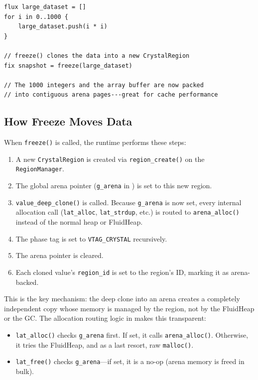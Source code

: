 \begin{lstlisting}[language=Lattice, caption={Freeze allocates into a CrystalRegion}]
flux large_dataset = []
for i in 0..1000 {
    large_dataset.push(i * i)
}

// freeze() clones the data into a new CrystalRegion
fix snapshot = freeze(large_dataset)

// The 1000 integers and the array buffer are now packed
// into contiguous arena pages---great for cache performance
\end{lstlisting}

\subsection{How Freeze Moves Data}

When \lstinline|freeze()| is called, the runtime performs these steps:

\begin{enumerate}
  \item A new \lstinline|CrystalRegion| is created via \lstinline|region_create()| on the \lstinline|RegionManager|.
  \item The global arena pointer (\lstinline|g_arena| in ) is set to this new region.
  \item \lstinline|value_deep_clone()| is called. Because \lstinline|g_arena| is now set, every internal allocation call (\lstinline|lat_alloc|, \lstinline|lat_strdup|, etc.) is routed to \lstinline|arena_alloc()| instead of the normal heap or FluidHeap.
  \item The phase tag is set to \lstinline|VTAG_CRYSTAL| recursively.
  \item The arena pointer is cleared.
  \item Each cloned value's \lstinline|region_id| is set to the region's ID, marking it as arena-backed.
\end{enumerate}

This is the key mechanism: the deep clone into an arena creates a completely independent copy whose memory is managed by the region, not by the FluidHeap or the GC.
The allocation routing logic in  makes this transparent:

\begin{itemize}
  \item \lstinline|lat_alloc()| checks \lstinline|g_arena| first. If set, it calls \lstinline|arena_alloc()|. Otherwise, it tries the FluidHeap, and as a last resort, raw \lstinline|malloc()|.
  \item \lstinline|lat_free()| checks \lstinline|g_arena|---if set, it is a no-op (arena memory is freed in bulk).
\end{itemize}

